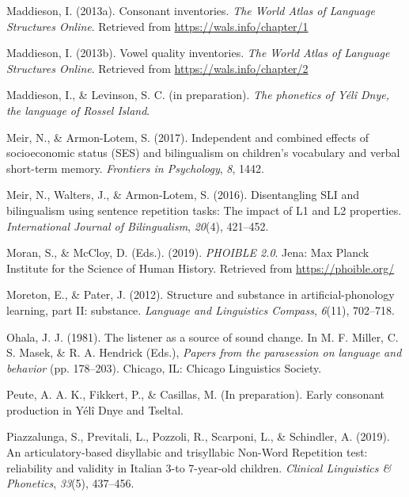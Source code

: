 \documentclass[
  american,
  ,man,floatsintext]{apa6}
\newlength{\cslhangindent}
\newlength{\cslentryspacingunit} %
\newenvironment{CSLReferences}[2] %
 {%
  \setlength{\parindent}{0pt}
  \ifodd #1
  \let\oldpar\par
  \def\par{\hangindent=\cslhangindent\oldpar}
  \fi
  \setlength{\parskip}{#2\cslentryspacingunit}
 }%
 {}
\begin{document}
\begin{CSLReferences}{1}{0}
\leavevmode{}%
Maddieson, I. (2013a). Consonant inventories. \emph{The World Atlas of Language Structures Online}. Retrieved from \url{https://wals.info/chapter/1}

\leavevmode{}%
Maddieson, I. (2013b). Vowel quality inventories. \emph{The World Atlas of Language Structures Online}. Retrieved from \url{https://wals.info/chapter/2}

\leavevmode{}%
Maddieson, I., \& Levinson, S. C. (in preparation). \emph{The phonetics of {Yélî Dnye}, the language of {Rossel Island}}.

\leavevmode{}%
Meir, N., \& Armon-Lotem, S. (2017). Independent and combined effects of socioeconomic status ({SES}) and bilingualism on children's vocabulary and verbal short-term memory. \emph{Frontiers in Psychology}, \emph{8}, 1442.

\leavevmode{}%
Meir, N., Walters, J., \& Armon-Lotem, S. (2016). {Disentangling SLI and bilingualism using sentence repetition tasks: The impact of L1 and L2 properties}. \emph{International Journal of Bilingualism}, \emph{20}(4), 421--452.

\leavevmode{}%
Moran, S., \& McCloy, D. (Eds.). (2019). \emph{PHOIBLE 2.0}. Jena: Max Planck Institute for the Science of Human History. Retrieved from \url{https://phoible.org/}

\leavevmode{}%
Moreton, E., \& Pater, J. (2012). Structure and substance in artificial-phonology learning, part {II}: substance. \emph{Language and Linguistics Compass}, \emph{6}(11), 702--718.

\leavevmode{}%
Ohala, J. J. (1981). The listener as a source of sound change. In M. F. Miller, C. S. Masek, \& R. A. Hendrick (Eds.), \emph{Papers from the parasession on language and behavior} (pp. 178--203). Chicago, IL: Chicago Linguistics Society.

\leavevmode{}%
Peute, A. A. K., Fikkert, P., \& Casillas, M. (In preparation). Early consonant production in {Y}élî {D}nye and {T}seltal.

\leavevmode{}%
Piazzalunga, S., Previtali, L., Pozzoli, R., Scarponi, L., \& Schindler, A. (2019). {An articulatory-based disyllabic and trisyllabic Non-Word Repetition test: reliability and validity in Italian 3-to 7-year-old children}. \emph{Clinical Linguistics \& Phonetics}, \emph{33}(5), 437--456.


\end{CSLReferences}
\end{document}
